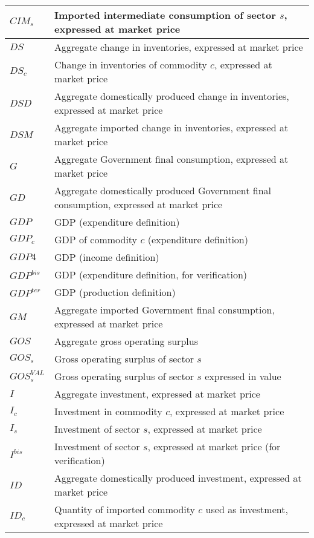 \documentclass[12pt]{article}
\numberwithin{equation}{section}
\begin{document}
\begin{longtable}{@{}p{4cm}p{9cm}@{}}
 \midrule 
$CIM_{s}$ & Imported intermediate consumption of sector $s$, expressed at market price \\
 \midrule 
$DS$ & Aggregate change in inventories, expressed at market price \\
 \midrule 
$DS_{c}$ & Change in inventories of commodity $c$, expressed at market price \\
 \midrule 
$DSD$ & Aggregate domestically produced change in inventories, expressed at market price \\
 \midrule 
$DSM$ & Aggregate imported change in inventories, expressed at market price \\
 \midrule 
$G$ & Aggregate Government final consumption, expressed at market price \\
 \midrule 
$GD$ & Aggregate domestically produced Government final consumption, expressed at market price \\
 \midrule 
$GDP$ & GDP (expenditure definition) \\
 \midrule 
$GDP_{c}$ & GDP of commodity $c$ (expenditure definition) \\
 \midrule 
$GDP4$ &   GDP (income definition) \\
 \midrule 
$GDP^{bis}$ & GDP (expenditure definition, for verification) \\
 \midrule 
$GDP^{ter}$ &  GDP (production definition) \\
 \midrule 
$GM$ & Aggregate imported Government final consumption, expressed at market price \\
 \midrule 
$GOS$ & Aggregate gross operating surplus \\
 \midrule 
$GOS_{s}$ & Gross operating surplus of sector $s$ \\
 \midrule 
$GOS^{VAL}_{s}$ & Gross operating surplus of sector $s$ expressed in value \\
 \midrule 
$I$ & Aggregate investment, expressed at market price \\
 \midrule 
$I_{c}$ & Investment in commodity $c$, expressed at market price \\
 \midrule 
$I_{s}$ & Investment of sector $s$, expressed at market price \\
 \midrule 
$I^{bis}$ & Investment of sector $s$, expressed at market price (for verification) \\
 \midrule 
$ID$ & Aggregate domestically produced investment, expressed at market price \\
 \midrule 
$ID_{c}$ & Quantity of imported commodity $c$ used as investment, expressed at market price \\

\end{longtable}
\end{document}
